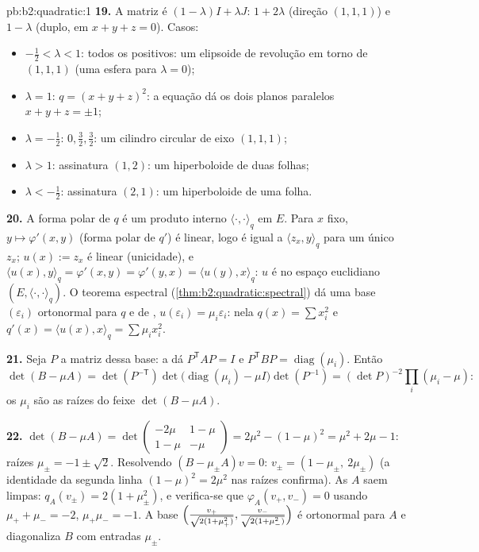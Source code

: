 \begin{solution}{pb:b2:quadratic:1}
\textbf{19.} A matriz é $(1-\lambda)I + \lambda J$:
 $1 + 2\lambda$ (direção $(1,1,1)$) e $1 -
\lambda$ (duplo, em $x + y + z = 0$). Casos:
\begin{itemize}
  \item $-\frac12 < \lambda < 1$: todos os  positivos:
        um elipsoide de revolução em torno de $(1,1,1)$ (uma esfera
        para $\lambda = 0$);
  \item $\lambda = 1$: $q = (x+y+z)^2$: a equação dá os
        dois planos paralelos $x + y + z = \pm1$;
  \item $\lambda = -\frac12$:  $0, \frac32,
        \frac32$: um cilindro circular de eixo $(1,1,1)$;
  \item $\lambda > 1$: assinatura $(1, 2)$: um hiperboloide de
        duas folhas;
  \item $\lambda < -\frac12$: assinatura $(2, 1)$: um
        hiperboloide de uma folha.
\end{itemize}

\textbf{20.} A forma polar de $q$ é um produto interno
$\langle\cdot,\cdot\rangle_q$ em $E$. Para $x$ fixo, $y \mapsto
\varphi'(x, y)$ (forma polar de $q'$) é linear, logo é igual a
$\langle z_x, y\rangle_q$ para um único $z_x$; $u(x) := z_x$ é
linear (unicidade), e $\langle u(x), y\rangle_q =
\varphi'(x,y) = \varphi'(y,x) = \langle u(y), x\rangle_q$: $u$
é  no espaço euclidiano $(E,
\langle\cdot,\cdot\rangle_q)$. O teorema espectral
(\cref{thm:b2:quadratic:spectral}) dá uma base $(\varepsilon_i)$ ortonormal para $q$
e de , $u(\varepsilon_i) =
\mu_i\varepsilon_i$: nela $q(x) = \sum x_i^2$ e $q'(x) =
\langle u(x), x\rangle_q = \sum\mu_ix_i^2$.

\textbf{21.} Seja $P$ a matriz dessa base: a 
dá $P^{\mathsf T}AP = I$ e $P^{\mathsf T}BP =
\operatorname{diag}(\mu_i)$. Então
\[
\det(B - \mu A) = \det(P^{-\mathsf T})
\det\bigl(\operatorname{diag}(\mu_i) - \mu I\bigr)
\det(P^{-1})
= (\det P)^{-2}\prod_i(\mu_i - \mu) :
\]
os $\mu_i$ são as raízes do feixe $\det(B - \mu A)$.

\textbf{22.} $\det(B - \mu A) =
\det\begin{pmatrix} -2\mu & 1-\mu\\ 1-\mu & -\mu\end{pmatrix}
= 2\mu^2 - (1-\mu)^2 = \mu^2 + 2\mu - 1$: raízes $\mu_\pm = -1
\pm \sqrt2$. Resolvendo $(B - \mu_\pm A)v = 0$: $v_\pm = (1 -
\mu_\pm,\ 2\mu_\pm)$ (a identidade da segunda linha $(1-\mu)^2 =
2\mu^2$ nas raízes confirma). As  $A$ saem
limpas: $q_A(v_\pm) = 2(1 + \mu_\pm^2)$, e verifica-se que
$\varphi_A(v_+, v_-) = 0$ usando $\mu_+ + \mu_- = -2$,
$\mu_+\mu_- = -1$. A base $\Bigl(\frac{v_+}{\sqrt{2(1 +
\mu_+^2)}}, \frac{v_-}{\sqrt{2(1+\mu_-^2)}}\Bigr)$ é
ortonormal para $A$ e diagonaliza $B$ com entradas
$\mu_\pm$.


\end{solution}
